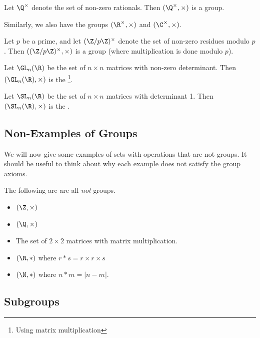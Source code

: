 \documentclass[a4paper]{scrartcl}
\newcommand{\newsection}{\subsection}
\begin{document}
\begin{example}
	Let $\Q^\times$ denote the set of non-zero rationals. Then $(\Q^\times, \times)$ is a group.
\end{example}
Similarly, we also have the groups $(\R^\times, \times)$ and $(\C^\times, \times)$.

\begin{example}
	Let $p$ be a prime, and let $(\Z / p \Z)^\times$ denote the set of non-zero residues modulo $p$. Then $((\Z / p \Z)^\times, \times)$ is a group (where multiplication is done modulo $p$).
\end{example}

\begin{example}
	Let $\GL_n(\R)$ be the set of $n \times n$ matrices with non-zero determinant. Then $(\GL_n(\R), \times)$ is the \footnote{Using matrix multiplication}.
\end{example}

\begin{example}
	Let $\SL_n(\R)$ be the set of $n \times n$ matrices with determinant 1. Then $(\SL_n(\R), \times)$ is the .
\end{example}

\subsection*{Non-Examples of Groups}

We will now give some examples of sets with operations that are not groups. It should be useful to think about why each example does not satisfy the group axioms.

\begin{example}
	The following are are all \emph{not} groups.
	\begin{itemize}
		\item $(\Z, \times)$
		\item $(\Q, \times)$
		\item The set of $2\times 2$ matrices with matrix multiplication.
		\item $(\R, *)$ where $r  * s = r\times r \times s$
		\item $(\N, *)$ where $n * m = |n - m|$.
	\end{itemize}
\end{example}

\newsection{Subgroups}
\end{document}
